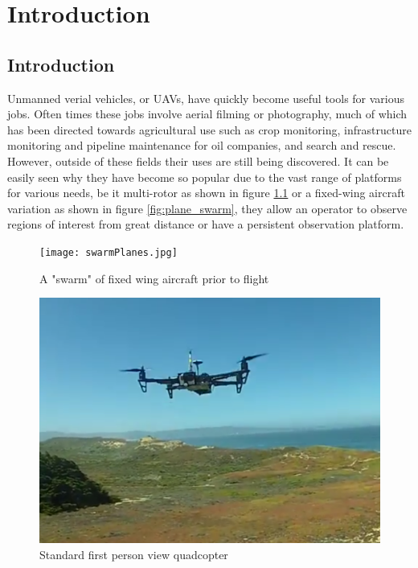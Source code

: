 \documentclass[12pt]{report}
\begin{document}
\tableofcontents

\chapter{Introduction}
\section{Introduction}
Unmanned verial vehicles, or UAVs, have quickly become useful tools for various jobs. Often times these jobs involve aerial filming or photography, much of which has been directed towards agricultural use such as crop monitoring, infrastructure monitoring and pipeline maintenance for oil companies, and search and rescue. However, outside of these fields their uses are still being discovered. It can be easily seen why they have become so popular due to the vast range of platforms for various needs, be it multi-rotor as shown in figure \ref{fig:quadcopter} or a fixed-wing aircraft variation as shown in figure \ref{fig:plane_swarm}, they allow an operator to observe regions of interest from great distance or have a persistent observation platform.
\begin{figure}[!ht]
	\centering
	\begin{minipage}{0.45\textwidth}
		\centering
		\texttt{[image: swarmPlanes.jpg]}
		\caption{A "swarm" of fixed wing aircraft prior to flight \cite{Vogt}}
		\label{fig:plane_swarm}
	\end{minipage}\hfill
	\begin{minipage}{0.45\textwidth}
		\centering
		\includegraphics[scale=0.17]{kevin_flight.png}
		\caption{Standard first person view quadcopter \cite{Vogt}}
		\label{fig:quadcopter}
	\end{minipage}
\end{figure}
\end{document}
